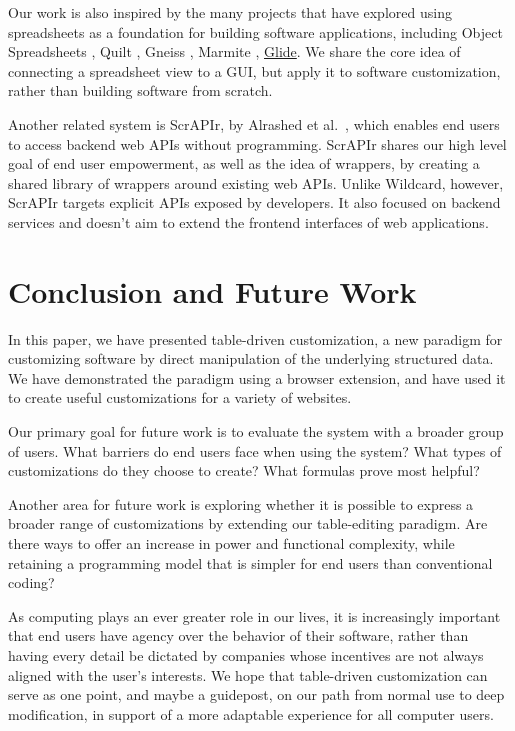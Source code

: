 \documentclass[sigplan,screen,10pt,anonymous,review]{acmart}
\begin{document}
Our work is also inspired by the many projects that have explored using
spreadsheets as a foundation for building software applications,
including Object Spreadsheets \citep{mccutchen2016}, Quilt
\citep{benson2014}, Gneiss \citep{chang2014}, Marmite \citep{wong2007},
\href{https://www.glideapps.com/}{Glide}. We share the core idea of
connecting a spreadsheet view to a GUI, but apply it to software
customization, rather than building software from scratch.

Another related system is ScrAPIr, by Alrashed et
al.~\citep{alrashed2020}, which enables end users to access backend web
APIs without programming. ScrAPIr shares our high level goal of end user
empowerment, as well as the idea of wrappers, by creating a shared
library of wrappers around existing web APIs. Unlike Wildcard, however,
ScrAPIr targets explicit APIs exposed by developers. It also focused on
backend services and doesn't aim to extend the frontend interfaces of
web applications.

\hypertarget{sec:conclusion}{%
\section{Conclusion and Future Work}\label{sec:conclusion}}

In this paper, we have presented table-driven customization, a new
paradigm for customizing software by direct manipulation of the
underlying structured data. We have demonstrated the paradigm using a
browser extension, and have used it to create useful customizations for
a variety of websites.

Our primary goal for future work is to evaluate the system with a
broader group of users. What barriers do end users face when using the
system? What types of customizations do they choose to create? What
formulas prove most helpful?

Another area for future work is exploring whether it is possible to
express a broader range of customizations by extending our table-editing
paradigm. Are there ways to offer an increase in power and functional
complexity, while retaining a programming model that is simpler for end
users than conventional coding?

As computing plays an ever greater role in our lives, it is increasingly
important that end users have agency over the behavior of their
software, rather than having every detail be dictated by companies whose
incentives are not always aligned with the user's interests. We hope
that table-driven customization can serve as one point, and maybe a
guidepost, on our path from normal use to deep modification, in support
of a more adaptable experience for all computer users.



\end{document}

